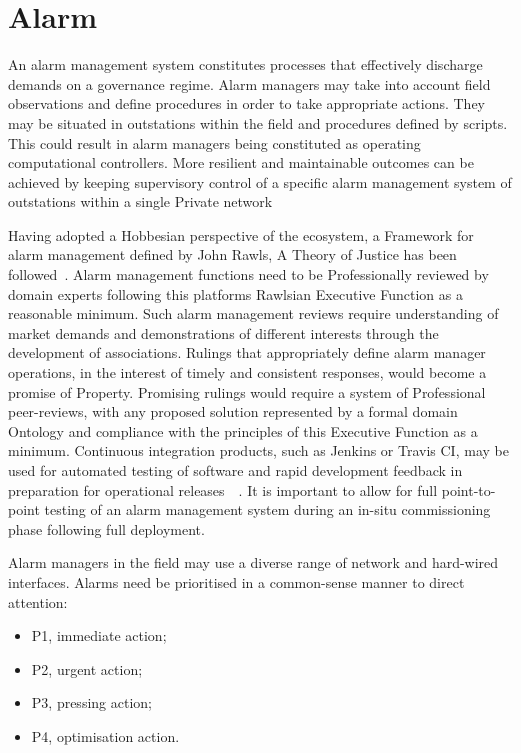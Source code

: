 \documentclass[11pt, oneside]{book}   	%
\begin{document}
\section{Alarm}
An alarm management system constitutes processes that effectively discharge demands on a governance regime.
Alarm managers may take into account field observations and define procedures in order to take appropriate actions.
They may be situated in outstations within the field and procedures defined by scripts.
This could result in alarm managers being constituted as operating computational controllers.
More resilient and maintainable outcomes can be achieved by keeping supervisory control of a specific alarm management system of outstations within a single Private network\

Having adopted a Hobbesian perspective of the ecosystem, a Framework for alarm management defined by John Rawls, A Theory of Justice has been followed~\cite{jr1}.
Alarm management functions need to be Professionally reviewed by domain experts following this platforms Rawlsian Executive Function as a reasonable minimum.
Such alarm management reviews require understanding of market demands and demonstrations of different interests through the development of associations.
Rulings that appropriately define alarm manager operations, in the interest of timely and consistent responses, would become a promise of Property.
Promising rulings would require a system of Professional peer-reviews, with any proposed solution represented by a formal domain Ontology and compliance with the principles of this Executive Function as a minimum.
Continuous integration products, such as Jenkins or Travis CI, may be used for automated testing of software and rapid development feedback in preparation for operational releases~\cite{jenkins}~\cite{travis}.
It is important to allow for full point-to-point testing of an alarm management system during an in-situ commissioning phase following full deployment.\

Alarm managers in the field may use a diverse range of network and hard-wired interfaces.
Alarms need be prioritised in a common-sense manner to direct attention:
\begin{itemize}
	\item P1, immediate action; 
	\item P2, urgent action;
	\item P3, pressing action;
	\item P4, optimisation action.
\end{itemize}
\end{document}
